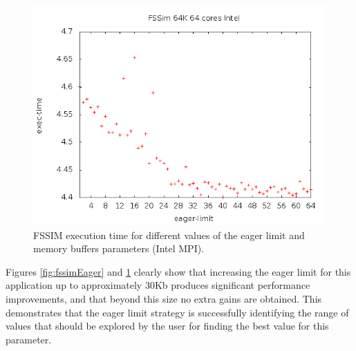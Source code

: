 \begin{figure}[bth]
  \center
  \includegraphics[width=0.65\paperwidth]{../BPG/images/MPImanual64cpu64kf.png}
	\caption{FSSIM execution time for different values of the eager limit and memory buffers parameters (Intel MPI).}
	\label{fig:fssimEagerIntel}
\end{figure}

Figures \ref{fig:fssimEager} and \ref{fig:fssimEagerIntel} clearly show that increasing the eager limit for this application up to approximately 30Kb produces  significant performance improvements, and that beyond this size no extra gains are obtained. This demonstrates that the eager limit strategy is successfully identifying the range of values that should be explored by the user for finding the best value for this parameter.

